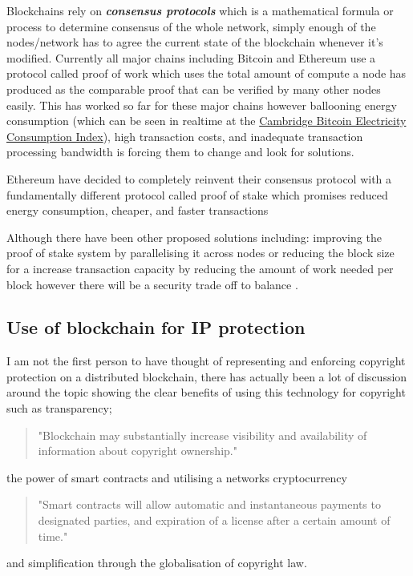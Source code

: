 \documentclass[12pt]{report}
\newcommand{\keyword}[1]{\textbf{\textit{#1}}}
\begin{document}
Blockchains rely on \keyword{consensus protocols} which is a mathematical formula or process to determine consensus of the whole network, simply enough of the nodes/network has to agree the current state of the blockchain whenever it's modified. Currently all major chains including Bitcoin and Ethereum use a protocol called proof of work \cite{PoW} which uses the total amount of compute a node has produced as the comparable proof that can be verified by many other nodes easily. This has worked so far for these major chains however ballooning energy consumption (which can be seen in realtime at the \href{https://ccaf.io/cbeci/index}{Cambridge Bitcoin Electricity Consumption Index}), high transaction costs, and inadequate transaction processing bandwidth is forcing them to change and look for solutions.

Ethereum have decided to completely reinvent their consensus protocol with a fundamentally different protocol called proof of stake which promises reduced energy consumption, cheaper, and faster transactions \cite{PoS}

Although there have been other proposed solutions including: improving the proof of stake system by parallelising it across nodes \cite{fi12080125} or reducing the block size for a increase transaction capacity by reducing the amount of work needed per block however there will be a security trade off to balance \cite{kiayias2015speed}.

\subsection{Use of blockchain for IP protection}

I am not the first person to have thought of representing and enforcing copyright protection on a distributed blockchain, there has actually been a lot of discussion around the topic showing the clear benefits of using this technology for copyright such as transparency; \begin{quote} "Blockchain may substantially increase visibility and availability of information about copyright ownership." \cite{Copyright_in_the_blockchain_era} \end{quote} the power of smart contracts and utilising a networks cryptocurrency \begin{quote} "Smart contracts will allow automatic and instantaneous payments to designated parties, and expiration of a license after a certain amount of time." \cite{Copyright_in_the_blockchain_era} \end{quote} and simplification through the globalisation of copyright law.
\end{document}
